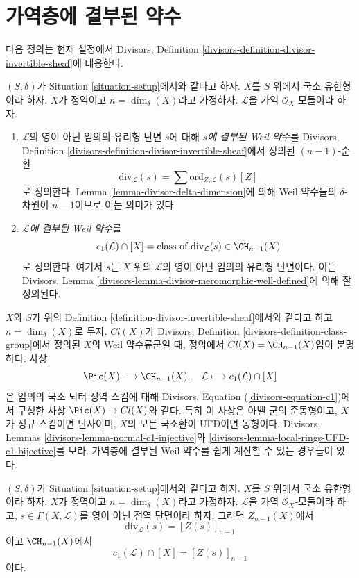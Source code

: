 \section{가역층에 결부된 약수}
\label{section-divisor-invertible-sheaf}

\noindent
다음 정의는 현재 설정에서 Divisors, Definition
\ref{divisors-definition-divisor-invertible-sheaf}에 대응한다.

\begin{definition}
\label{definition-divisor-invertible-sheaf}
$(S, \delta)$가 Situation \ref{situation-setup}에서와 같다고 하자.
$X$를 $S$ 위에서 국소 유한형이라 하자. $X$가 정역이고
$n = \dim_\delta(X)$라고 가정하자. $\mathcal{L}$을 가역
$\mathcal{O}_X$-모듈이라 하자.
\begin{enumerate}
\item $\mathcal{L}$의 영이 아닌 임의의 유리형 단면 $s$에 대해
{\it $s$에 결부된 Weil 약수}를 Divisors, Definition
\ref{divisors-definition-divisor-invertible-sheaf}에서 정의된
$(n - 1)$-순환
$$
\text{div}_\mathcal{L}(s) =
\sum \text{ord}_{Z, \mathcal{L}}(s) [Z]
$$
로 정의한다. Lemma \ref{lemma-divisor-delta-dimension}에 의해 Weil
약수들의 $\delta$-차원이 $n - 1$이므로 이는 의미가 있다.
\item {\it $\mathcal{L}$에 결부된 Weil 약수}를
$$
c_1(\mathcal{L}) \cap [X] =
\text{class of }\text{div}_\mathcal{L}(s) \in \CH_{n - 1}(X)
$$
로 정의한다. 여기서 $s$는 $X$ 위의 $\mathcal{L}$의 영이 아닌 임의의
유리형 단면이다. 이는 Divisors, Lemma
\ref{divisors-lemma-divisor-meromorphic-well-defined}에 의해 잘 정의된다.
\end{enumerate}
\end{definition}

\noindent
$X$와 $S$가 위의 Definition
\ref{definition-divisor-invertible-sheaf}에서와 같다고 하고
$n = \dim_\delta(X)$로 두자. $Cl(X)$가 Divisors, Definition
\ref{divisors-definition-class-group}에서 정의된 $X$의 Weil 약수류군일
때, 정의에서 $Cl(X) = \CH_{n - 1}(X)$임이 분명하다. 사상
$$
\Pic(X) \longrightarrow \CH_{n - 1}(X), \quad
\mathcal{L} \longmapsto c_1(\mathcal{L}) \cap [X]
$$
은 임의의 국소 뇌터 정역 스킴에 대해 Divisors, Equation
(\ref{divisors-equation-c1})에서 구성한 사상 $\Pic(X) \to Cl(X)$와
같다. 특히 이 사상은 아벨 군의 준동형이고, $X$가 정규 스킴이면
단사이며, $X$의 모든 국소환이 UFD이면 동형이다. Divisors, Lemmas
\ref{divisors-lemma-normal-c1-injective}와
\ref{divisors-lemma-local-rings-UFD-c1-bijective}를 보라. 가역층에 결부된
Weil 약수를 쉽게 계산할 수 있는 경우들이 있다.

\begin{lemma}
\label{lemma-compute-c1}
$(S, \delta)$가 Situation \ref{situation-setup}에서와 같다고 하자.
$X$를 $S$ 위에서 국소 유한형이라 하자. $X$가 정역이고
$n = \dim_\delta(X)$라고 가정하자. $\mathcal{L}$을 가역
$\mathcal{O}_X$-모듈이라 하고, $s \in \Gamma(X, \mathcal{L})$를 영이
아닌 전역 단면이라 하자. 그러면 $Z_{n - 1}(X)$에서
$$
\text{div}_\mathcal{L}(s) = [Z(s)]_{n - 1}
$$
이고 $\CH_{n - 1}(X)$에서
$$
c_1(\mathcal{L}) \cap [X] = [Z(s)]_{n - 1}
$$
이다.
\end{lemma}

